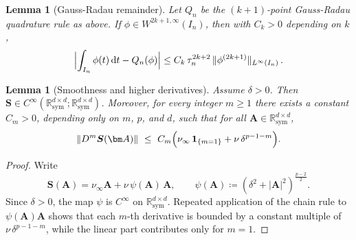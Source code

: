 \documentclass[DIV=16]{scrartcl}
\newtheorem{lemma}[theorem]{Lemma}
\DeclareMathOperator{\sym}{sym}
\newcommand{\norm}[1]{\left\lVert #1\right\rVert}
\newcommand{\abs}[1]{\left\lvert #1\right\rvert}
\newcommand{\Sstress}{\boldsymbol S} %
\newcommand{\In}{I_n}
\newcommand{\drv}{\mkern3mu\mathrm{d}}
\newcommand{\Dt}{\drv t}
\newcommand{\reg}{\delta}
\newcommand{\pn}{p}
\begin{document}
\begin{lemma}[Gauss-Radau remainder]\label{lem:gr-quadrature}
Let $Q_n$ be the $(k{+}1)$-point Gauss-Radau quadrature rule as above.
If $\phi\in W^{2k+1,\infty}(\In)$, then with $C_k>0$ depending on $k$,
\[
  \Bigl|\int_{\In}\phi(t)\Dt - Q_n(\phi)\Bigr|
  \le C_k\,\tau_n^{2k+2}\,\|\phi^{(2k+1)}\|_{L^\infty(\In)}\,.
\]
\end{lemma}

\begin{lemma}[Smoothness and higher derivatives]
  \label{lem:stress-higher-derivatives}
  Assume $\reg>0$. Then $\Sstress\in C^\infty(\mathbb{R}^{d\times d}_{\mathrm{sym}};\mathbb{R}^{d\times d}_{\mathrm{sym}})$.
  Moreover, for every integer $m\ge 1$ there exists a constant $C_m>0$, depending only on $m$, $\pn$, and $d$, such that for all $\bm A\in\mathbb{R}^{d\times d}_{\mathrm{sym}}$,
  \[
    \norm{D^m\Sstress(\bm A)}
    \ \le\ C_m\Bigl(\nu_{\infty}\,\mathbf 1_{\{m=1\}}+\nu\,\reg^{\pn-1-m}\Bigr).
  \]
\end{lemma}
\begin{proof}
  Write
  \[
    \Sstress(\bm A)
    = \nu_\infty \bm A + \nu\,\psi(\bm A)\,\bm A,
    \qquad
    \psi(\bm A)\coloneq (\reg^2+\abs{\bm A}^2)^{\frac{\pn-2}{2}}.
  \]
  Since $\reg>0$, the map $\psi$ is $C^\infty$ on $\mathbb{R}^{d\times d}_{\sym}$. Repeated application of the chain rule to $\psi(\bm A)\bm A$ shows that each $m$-th derivative is bounded by a constant multiple of
  $\nu\,\reg^{\pn-1-m}$, while the linear part contributes only for $m=1$.
\end{proof}
\end{document}
